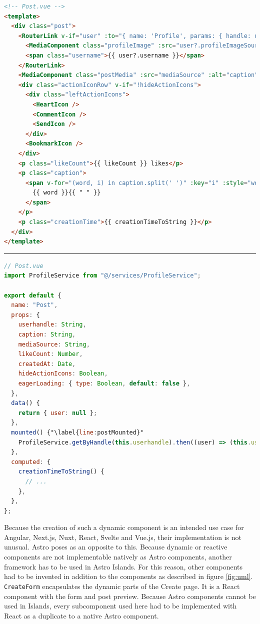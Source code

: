 \documentclass[a4paper, 12pt]{article}
\begin{document}
\vspace{1cm}
\begin{lstlisting}[caption=Post in Vue.js (Template), label={lst:Vue:Post:Template}, language=HTML]
<!-- Post.vue -->
<template>
  <div class="post">
    <RouterLink v-if="user" :to="{ name: 'Profile', params: { handle: userhandle } }" class="postUserInfo" >
      <MediaComponent class="profileImage" :src="user?.profileImageSource" alt="" width="44" height="44" />
      <span class="username">{{ user?.username }}</span>
    </RouterLink>
    <MediaComponent class="postMedia" :src="mediaSource" :alt="caption" width="100%" height="100%" :eagerLoading="eagerLoading" />
    <div class="actionIconRow" v-if="!hideActionIcons">
      <div class="leftActionIcons">
        <HeartIcon />
        <CommentIcon />
        <SendIcon />
      </div>
      <BookmarkIcon />
    </div>
    <p class="likeCount">{{ likeCount }} likes</p>
    <p class="caption">
      <span v-for="(word, i) in caption.split(' ')" :key="i" :style="word.startsWith('#') ? 'color: #0091E2' : ''">
        {{ word }}{{ " " }}
      </span>
    </p>
    <p class="creationTime">{{ creationTimeToString }}</p>
  </div>
</template>
\end{lstlisting}
\hrule
\begin{lstlisting}[caption=Post in Vue.js (Script), label={lst:Vue:Post:Script}, language=JavaScript, firstnumber=26, escapechar=°]
// Post.vue
import ProfileService from "@/services/ProfileService";

export default {
  name: "Post",
  props: {
    userhandle: String,
    caption: String,
    mediaSource: String,
    likeCount: Number,
    createdAt: Date,
    hideActionIcons: Boolean,
    eagerLoading: { type: Boolean, default: false },
  },
  data() {
    return { user: null };
  },
  mounted() {°\label{line:postMounted}°
    ProfileService.getByHandle(this.userhandle).then((user) => (this.user = user));
  },
  computed: {
    creationTimeToString() {
      // ...
    },
  },
};
\end{lstlisting}
\vspace{1cm}

Because the creation of such a dynamic component is an intended use case for Angular, Next.js, Nuxt, React, Svelte and Vue.js, their implementation is not unusual.
Astro poses as an opposite to this.
Because dynamic or reactive components are not implementable natively as Astro components, another framework has to be used in Astro Islands.
For this reason, other components had to be invented in addition to the components as described in figure \ref{fig:uml}.
\verb|CreateForm| encapsulates the dynamic parts of the Create page.
It is a React component with the form and post preview.
Because Astro components cannot be used in Islands, every subcomponent used here had to be implemented with React as a duplicate to a native Astro component.
\end{document}
